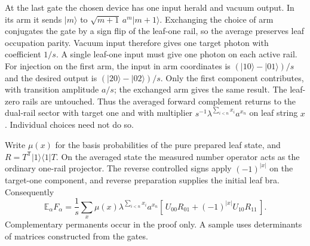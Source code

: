 \documentclass[11pt]{article}
\newcommand{\E}{\mathbb E}
\newcommand{\ket}[1]{\lvert #1\rangle}
\newcommand{\bra}[1]{\langle #1\rvert}
\begin{document}
At the last gate the chosen device has one input herald and vacuum output. In its arm it sends \(\ket m\) to \(\sqrt{m+1}\,a^m\ket{m+1}\). Exchanging the choice of arm conjugates the gate by a sign flip of the leaf-one rail, so the average preserves leaf occupation parity. Vacuum input therefore gives one target photon with coefficient \(1/s\). A single leaf-one input must give one photon on each active rail. For injection on the first arm, the input in arm coordinates is \((\ket{10}-\ket{01})/s\) and the desired output is \((\ket{20}-\ket{02})/s\). Only the first component contributes, with transition amplitude \(a/s\); the exchanged arm gives the same result. The leaf-zero rails are untouched. Thus the averaged forward complement returns to the dual-rail sector with target one and with multiplier \(s^{-1}\lambda^{\sum_{i<n}x_i}a^{x_n}\) on leaf string \(x\). Individual choices need not do so.

Write \(\mu(x)\) for the basis probabilities of the pure prepared leaf state, and \(R=T^\mathsf T\ket1\!\bra1 T\). On the averaged state the measured number operator acts as the ordinary one-rail projector. The reverse controlled signs apply \((-1)^{|x|}\) on the target-one component, and reverse preparation supplies the initial leaf bra. Consequently
\begin{equation}
 \E_\alpha F_\alpha=\frac1s\sum_x \mu(x)\lambda^{\sum_{i<n}x_i}a^{x_n}
       [\,U_{00}R_{01}+(-1)^{|x|}U_{10}R_{11}\,]. \label{eq:complement}
\end{equation}
Complementary permanents occur in the proof only. A sample uses determinants of matrices constructed from the gates.
\end{document}
